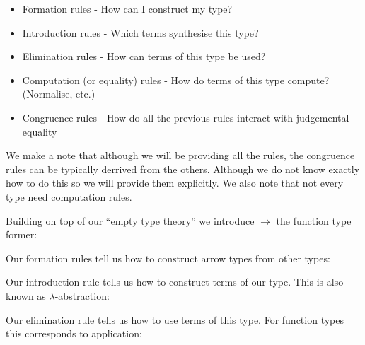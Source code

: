 \begin{itemize}
    \item Formation rules - How can I construct my type?
    \item Introduction rules - Which terms synthesise this type?
    \item Elimination rules - How can terms of this type be used?
    \item Computation (or equality) rules - How do terms of this type compute? (Normalise, etc.)
    \item Congruence rules - How do all the previous rules interact with judgemental equality
\end{itemize}

We make a note that although we will be providing all the rules, the congruence rules can be typically derrived from the others. Although we do not know exactly how to do this so we will provide them explicitly. We also note that not every type need computation rules.

Building on top of our ``empty type theory'' we introduce $\to$ the function type former:

\begin{defin}

    Our formation rules tell us how to construct arrow types from other types:
    
    \begin{prooftree}
    \end{prooftree}

\end{defin}

\begin{defin}

    Our introduction rule tells us how to construct terms of our type. This is also known as $\lambda$-abstraction:

    \begin{prooftree}
    \end{prooftree}

\end{defin}

\begin{defin}

    Our elimination rule tells us how to use terms of this type. For function types this corresponds to application:

    \begin{prooftree}
    \end{prooftree}

\end{defin}

